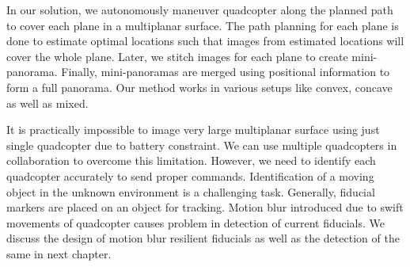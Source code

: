 In our solution, we autonomously maneuver quadcopter along the planned path to
cover each plane in a multiplanar surface. The path planning for each plane is
done to estimate optimal locations such that images from estimated locations will cover
the whole plane. Later, we stitch images for each plane to create mini-panorama.
Finally, mini-panoramas are merged using positional information to form a full panorama.
Our method works in various setups like convex, concave as well as mixed.

It is practically impossible to image very large multiplanar surface using
just single quadcopter due to battery constraint. We can use multiple
quadcopters in collaboration to overcome this limitation. However, we need to
identify each quadcopter accurately to send proper commands. Identification of
a moving object in the unknown environment is a challenging task. Generally, 
fiducial markers are placed on an object for tracking. Motion blur introduced
due to swift movements of quadcopter causes problem in detection of current
fiducials. We discuss the design of motion blur resilient fiducials as well as
the detection of the same in next chapter.
